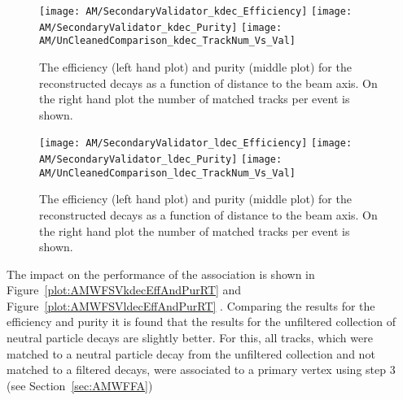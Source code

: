 \begin{figure}[!ht]
  \centering
  \texttt{[image: AM/SecondaryValidator\_kdec\_Efficiency]}
  \texttt{[image: AM/SecondaryValidator\_kdec\_Purity]}
  \texttt{[image: AM/UnCleanedComparison\_kdec\_TrackNum\_Vs\_Val]}
  \caption[Purity and efficiency of the reconstructed \PKzS{} decays as a function of distance to the beam axis and number of matched tracks]{The efficiency (left hand plot) and purity (middle plot) for the reconstructed \PKzS{} decays as a function of distance to the beam axis. On the right hand plot the number of matched tracks per event is shown. \label{plot:AMWFSVkdecEffAndPurDC}}
\end{figure}
\begin{figure}[!ht]
  \centering
  \texttt{[image: AM/SecondaryValidator\_ldec\_Efficiency]}
  \texttt{[image: AM/SecondaryValidator\_ldec\_Purity]}
  \texttt{[image: AM/UnCleanedComparison\_ldec\_TrackNum\_Vs\_Val]}
  \caption[Purity and efficiency of the reconstructed \PgL{} decays as a function of distance to the beam axis and number of matched tracks]{The efficiency (left hand plot) and purity (middle plot) for the reconstructed \PgL{} decays as a function of distance to the beam axis. On the right hand plot the number of matched tracks per event is shown. \label{plot:AMWFSVldecEffAndPurDC}}
\end{figure}

The impact on the performance of the association is shown in Figure~\ref{plot:AMWFSVkdecEffAndPurRT} and Figure~\ref{plot:AMWFSVldecEffAndPurRT} . Comparing the results for the efficiency and purity it is found that the results for the unfiltered collection of neutral particle decays are slightly better. For this, all tracks, which were matched to a neutral particle decay from the unfiltered collection and not matched to a filtered decays, were associated to a primary vertex using step 3 (see Section~\ref{sec:AMWFFA})

